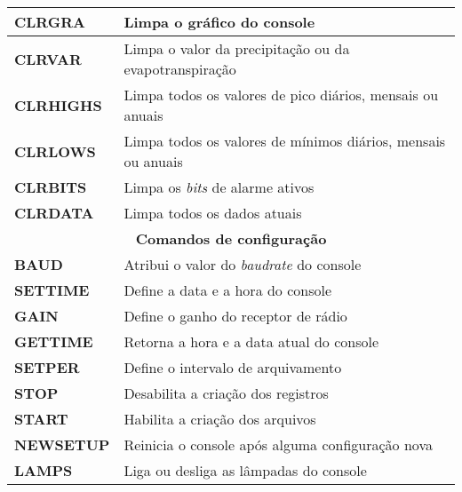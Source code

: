 \begin{anexosenv}
\begin{center}
\begin{longtable}{ll}
        \textbf{CLRGRA}                   & Limpa o gráfico do console \\ \hline
        \textbf{CLRVAR}                   & Limpa o valor da precipitação ou da evapotranspiração \\ \hline
        \textbf{CLRHIGHS}                   & Limpa todos os valores de pico diários, mensais ou anuais                                   \\ \hline
        \textbf{CLRLOWS}                   & Limpa todos os valores de mínimos diários, mensais ou anuais \\ \hline
        \textbf{CLRBITS}                   & Limpa os \textit{bits} de alarme ativos                                  \\ \hline
        \textbf{CLRDATA}                   & Limpa todos os dados atuais                                   \\ \hline
        \multicolumn{2}{c}{\cellcolor{gray!25}\textbf{Comandos de configuração}}                                     		 \\ \hline
        \textbf{BAUD}                 & Atribui o valor do \textit{baudrate} do console                                                       \\ \hline
        \textbf{SETTIME}                   & Define a data e a hora do console                                   \\ \hline
        \textbf{GAIN}                   & Define o ganho do receptor de rádio                                   \\ \hline
        \textbf{GETTIME}                   & Retorna a hora e a data atual do console                                   \\ \hline
        \textbf{SETPER}                   & Define o intervalo de arquivamento                                   \\ \hline
        \textbf{STOP}                   & Desabilita a criação dos registros                                   \\ \hline
        \textbf{START}                   & Habilita a criação dos arquivos \\ \hline
        \textbf{NEWSETUP}                   & Reinicia o console após alguma configuração nova                                  \\ \hline
        \textbf{LAMPS}                   & Liga ou desliga as lâmpadas do console \\ \hline

        \end{longtable}
    \end{center}


\end{anexosenv}
